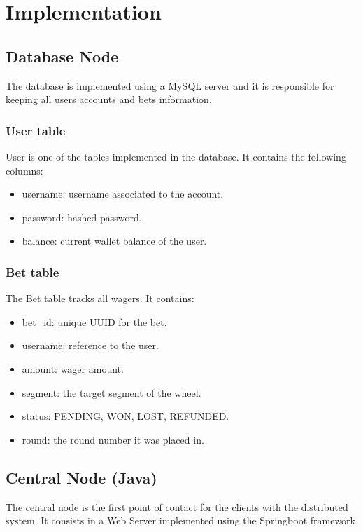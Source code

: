 \documentclass[12pt,a4paper]{article}
\begin{document}
\section{Implementation}

\subsection{Database Node}
The database is implemented using a MySQL server and it is responsible for keeping all users accounts and bets information.

\subsubsection{User table}
User is one of the tables implemented in the database. It contains the following columns:
\begin{itemize}
    \item username: username associated to the account.
    \item password: hashed password.
    \item balance: current wallet balance of the user.
\end{itemize}

\subsubsection{Bet table}
The Bet table tracks all wagers. It contains:
\begin{itemize}
    \item bet\_id: unique UUID for the bet.
    \item username: reference to the user.
    \item amount: wager amount.
    \item segment: the target segment of the wheel.
    \item status: PENDING, WON, LOST, REFUNDED.
    \item round: the round number it was placed in.
\end{itemize}

\subsection{Central Node (Java)}
The central node is the first point of contact for the clients with the distributed system. It consists in a Web Server implemented using the Springboot framework.
\end{document}
